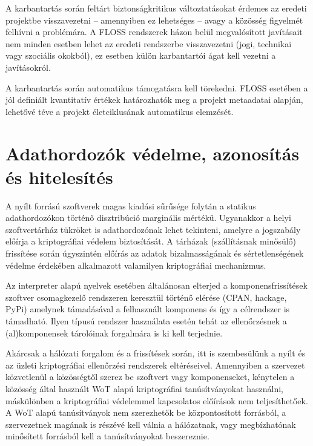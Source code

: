 \documentclass[12pt,magyar,a4paper,oneside]{scrreprt}
\begin{document}
A karbantartás során feltárt biztonságkritikus változtatásokat érdemes
az eredeti projektbe visszavezetni -- amennyiben ez lehetséges -- avagy
a közösség figyelmét felhívni a problémára. A FLOSS rendszerek házon
belül megvalósított javításait nem minden esetben lehet az eredeti
rendszerbe visszavezetni (jogi, technikai vagy szociális okokból), ez
esetben külön karbantartói ágat kell vezetni a javításokról.

A karbantartás során automatikus támogatásra kell törekedni. FLOSS
esetében a jól definiált kvantitatív értékek határozhatók meg a projekt
metaadatai alapján, lehetővé téve a projekt életciklusának automatikus
elemzését.

\hypertarget{adathordozuxf3k-vuxe9delme-azonosuxedtuxe1s-uxe9s-hitelesuxedtuxe9s}{%
\section{Adathordozók védelme, azonosítás és
hitelesítés}\label{adathordozuxf3k-vuxe9delme-azonosuxedtuxe1s-uxe9s-hitelesuxedtuxe9s}}

A nyílt forrású szoftverek magas kiadási sűrűsége folytán a statikus
adathordozókon történő disztribúció marginális mértékű. Ugyanakkor a
helyi szoftvertárház tükröket is adathordozónak lehet tekinteni, amelyre
a jogszabály előírja a kriptográfiai védelem biztosítását. A tárházak
(szállításnak minősülő) frissítése során úgyszintén előírás az adatok
bizalmasságának és sértetlenségének védelme érdekében alkalmazott
valamilyen kriptográfiai mechanizmus.

Az interpreter alapú nyelvek esetében általánosan elterjed a
komponensfrissítések szoftver csomagkezelő rendszeren keresztül történő
elérése (CPAN, hackage, PyPi) amelynek támadásával a felhasznált
komponens és így a célrendszer is támadható. Ilyen típusú rendszer
használata esetén tehát az ellenőrzésnek a (al)komponensek tárolóinak
forgalmára is ki kell terjednie.

Akárcsak a hálózati forgalom és a frissítések során, itt is szembesülünk
a nyílt és az üzleti kriptográfiai ellenőrzési rendszerek eltéréseivel.
Amennyiben a szervezet közvetlenül a közösségtől szerez be szoftvert
vagy komponenseket, kénytelen a közösség által használt WoT alapú
kriptográfiai tanúsítványokat használni, máskülönben a kriptográfiai
védelemmel kapcsolatos előírások nem teljesíthetőek. A WoT alapú
tanúsítványok nem szerezhetők be központosított forrásból, a
szervezetnek magának is részévé kell válnia a hálózatnak, vagy
megbízhatónak minősített forrásból kell a tanúsítványokat beszereznie.
\end{document}
